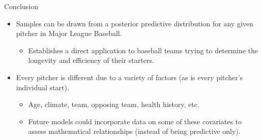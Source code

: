 \documentclass[xcolor=dvipsnames]{beamer}
\begin{document}

\begin{frame}{Conclusion}

\begin{itemize}
    \item Samples can be drawn from a posterior predictive distribution for any given pitcher in Major League Baseball.
        \begin{itemize}
            \item Establishes a direct application to baseball teams trying to determine the longevity and efficiency of their starters.
        \end{itemize}
    \item Every pitcher is different due to a variety of factors (as is every pitcher's individual start).
    \begin{itemize}
        \item Age, climate, team, opposing team, health history, etc.
        \item Future models could incorporate data on some of these covariates to assess mathematical relationships (instead of being predictive only).
    \end{itemize}
    
\end{itemize}



\end{frame}
\end{document}
